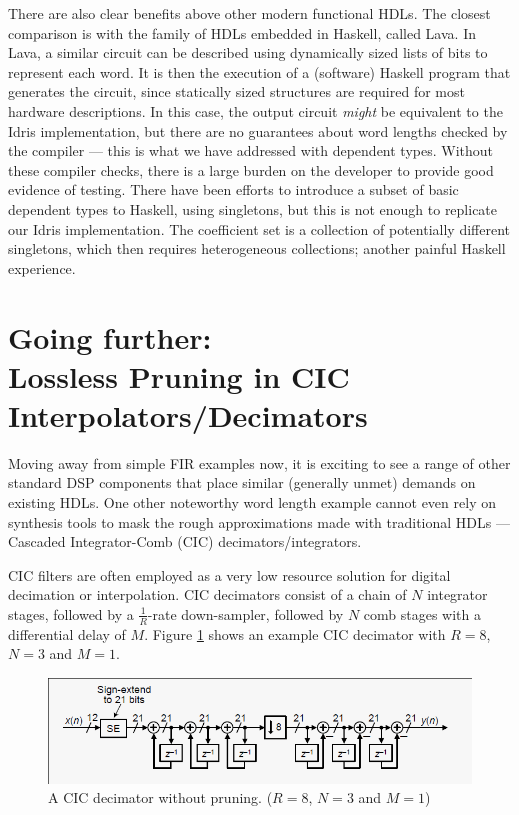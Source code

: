 \documentclass[conference]{IEEEtran}
\begin{document}
There are also clear benefits above other modern functional HDLs. The closest
comparison is with the family of HDLs embedded in Haskell, called
Lava\cite{gill_09}. In Lava, a similar circuit can be described using dynamically
sized lists of bits to represent each word. It is then the execution of a
(software) Haskell program that generates the circuit, since statically sized
structures are required for most hardware descriptions. In this case, the output
circuit \emph{might} be equivalent to the Idris implementation, but there are no
guarantees about word lengths checked by the compiler --- this is what we have
addressed with dependent types. Without these compiler checks, there is a large
burden on the developer to provide good evidence of testing. There have been
efforts to introduce a subset of basic dependent types to Haskell, using
singletons, but this is not enough to replicate our Idris
implementation\cite{lindley_13}. The coefficient set is a collection of
potentially different singletons, which then requires heterogeneous collections;
another painful Haskell experience.

\section{Going further:\\Lossless Pruning in CIC Interpolators/Decimators}

Moving away from simple FIR examples now, it is exciting to see a range of other
standard DSP components that place similar (generally unmet) demands on existing
HDLs. One other noteworthy word length example cannot even rely on synthesis
tools to mask the rough approximations made with traditional HDLs --- Cascaded
Integrator-Comb (CIC) decimators/integrators.

CIC filters are often employed as a very low resource solution for digital
decimation or interpolation. CIC decimators consist of a chain of $N$ integrator
stages, followed by a $\frac{1}{R}$-rate down-sampler, followed by $N$ comb
stages with a differential delay of $M$. Figure \ref{fig:cic} shows an example
CIC decimator with $R=8$, $N=3$ and $M=1$.

\begin{figure}
  \centering
  \includegraphics[width=\linewidth]{img/cic_draft}
  \caption{A CIC decimator without pruning. ($R=8$, $N=3$ and $M=1$)}
  \label{fig:cic}
\end{figure}
\end{document}
